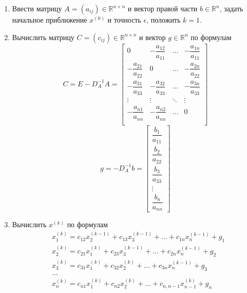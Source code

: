 \documentclass[a4paper, 12pt]{article}
\theoremstyle{definition}
\begin{document}
	\begin{enumerate}
		\item Ввести матрицу $A=(a_{ij})\in \mathbb{R}^{n\times n}$ и вектор правой части $b\in \mathbb{R}^n$, задать начальное приближение $x^{(0)}$ и точность $\epsilon$, положить $k=1$.
		\item Вычислить матрицу $C=(c_{ij})\in \mathbb{R}^{n\times n}$ и вектор $g\in \mathbb{R}^n$ по формулам
		\begin{equation} \label{C_matrix}
			C=E-D_A^{-1}A=
			\begin{bmatrix}
				0 & -\dfrac{a_{12}}{a_{11}} & \dots & -\dfrac{a_{1n}}{a_{11}} \\[2ex]
				-\dfrac{a_{21}}{a_{22}} & 0 & \dots & -\dfrac{a_{2n}}{a_{22}} \\[2ex]
				-\dfrac{a_{31}}{a_{33}} & -\dfrac{a_{32}}{a_{33}} & \dots & -\dfrac{a_{3n}}{a_{33}} \\
				\vdots & \vdots & \ddots & \vdots \\
				-\dfrac{a_{n1}}{a_{nn}} & -\dfrac{a_{n2}}{a_{nn}} & \dots & 0 \\
			\end{bmatrix}
		\end{equation}
		\begin{equation} \label{g_vector}
			g=-D_A^{-1}b=
			\begin{bmatrix}
				\dfrac{b_1}{a_{11}} \\[2ex]
				\dfrac{b_2}{a_{22}} \\[2ex]
				\dfrac{b_3}{a_{33}} \\
				\vdots \\
				\dfrac{b_n}{a_{nn}}
			\end{bmatrix}
		\end{equation}
		\item Вычислить $x^{(k)}$ по формулам
		\begin{equation} \label{iters}
			\begin{aligned}
				&x^{(k)}_1 = c_{12}x^{(k-1)}_2 + c_{13}x^{(k-1)}_3 + \dots + c_{1n}x^{(k-1)}_n + g_1 \\
				&x^{(k)}_2 = c_{21}x^{(k)}_1 + c_{23}x^{(k-1)}_3 + \dots + c_{2n}x^{(k-1)}_n + g_2 \\
				&x^{(k)}_3 = c_{31}x^{(k)}_1 + c_{32}x^{(k)}_2 + \dots + c_{3n}x^{(k-1)}_n + g_3 \\
				&\dots \\
				&x^{(k)}_n = c_{n1}x^{(k)}_1 + c_{n2}x^{(k)}_2 + \dots + c_{n,n-1}x^{(k)}_{n-1} + g_n \\
			\end{aligned}

\end{equation}
\end{enumerate}
\end{document}
